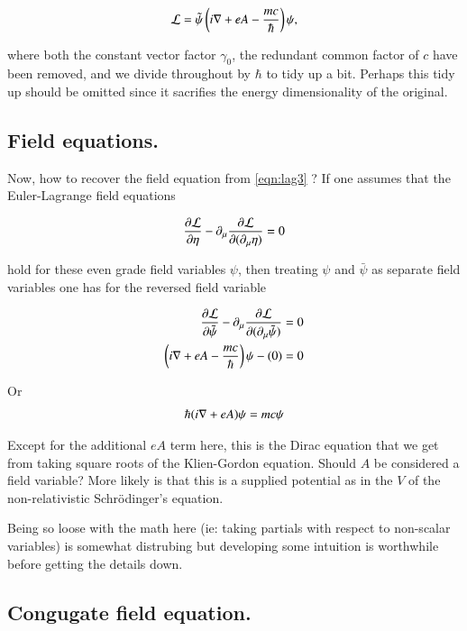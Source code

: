 \documentclass{article}
\begin{document}
\begin{align}\label{eqn:lag3}
\mathcal{L} = \tilde{\psi} \left( i \nabla + e A - \frac{mc}{\hbar} \right) \psi,
\end{align}

where both the constant vector factor $\gamma_0$, the redundant common factor of $c$ have been removed, and we divide throughout by $\hbar$ to tidy up a bit.  Perhaps this tidy up should be omitted since it sacrifies the 
energy dimensionality of the original.

\subsection{ Field equations. }

Now, how to recover the field equation from \ref{eqn:lag3} 
?  If one assumes that the Euler-Lagrange field equations

\begin{align*}
\frac{\partial {\mathcal{L}}}{\partial {\eta}} - \partial_\mu \frac{\partial {\mathcal{L}}}{\partial {(\partial_\mu \eta)}} = 0
\end{align*}

hold for these even grade field variables $\psi$, then treating $\psi$ and $\bar \psi$ as separate field variables one has for the reversed field variable

\begin{align*}
\frac{\partial {\mathcal{L}}}{\partial {\tilde{\psi}}} - \partial_\mu \frac{\partial {\mathcal{L}}}{\partial {(\partial_\mu \tilde{\psi})}} &= 0 \\
\left( i \nabla + e A - \frac{mc}{\hbar}\right) \psi - (0) &= 0
\end{align*}

Or 
\begin{align*}
\hbar (i \nabla + e A) \psi = mc \psi
\end{align*}

Except for the additional $e A$ term here, this is the Dirac equation that we get from taking square roots of the Klien-Gordon equation.  Should $A$ be considered a field variable?  More likely is that this is a supplied potential as in the $V$ of the non-relativistic 
Schr\"{o}dinger's equation.

Being so loose with the math here (ie: taking partials with respect to non-scalar variables) is somewhat distrubing but developing some intuition is worthwhile before getting the details down.

\subsection{ Congugate field equation. }
\end{document}
